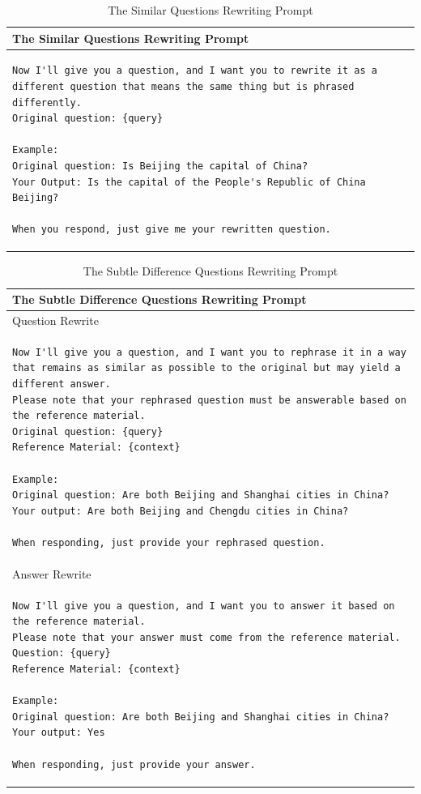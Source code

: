 \begin{table}[h]
\centering
\begin{tabular}{p{\textwidth}}
\toprule
\textbf{The Similar Questions Rewriting Prompt} \\ 
\midrule
\begin{lstlisting}[basicstyle=\ttfamily\small, frame=single, breaklines=true, breakindent=0pt]
Now I'll give you a question, and I want you to rewrite it as a different question that means the same thing but is phrased differently.
Original question: {query}

Example:
Original question: Is Beijing the capital of China?
Your Output: Is the capital of the People's Republic of China Beijing?

When you respond, just give me your rewritten question.
\end{lstlisting} \\
\bottomrule
\end{tabular}
\caption{The Similar Questions Rewriting Prompt}
\label{tab:similar-rewrite-prompt}
\end{table}

\begin{table}[h]
\centering
\begin{tabular}{p{\textwidth}}
\toprule
\textbf{The Subtle Difference Questions Rewriting Prompt} \\ 
\midrule
Question Rewrite \\
\hline
\begin{lstlisting}[basicstyle=\ttfamily\small, frame=single, breaklines=true, breakindent=0pt]
Now I'll give you a question, and I want you to rephrase it in a way that remains as similar as possible to the original but may yield a different answer.
Please note that your rephrased question must be answerable based on the reference material.
Original question: {query}
Reference Material: {context}

Example:
Original question: Are both Beijing and Shanghai cities in China?
Your output: Are both Beijing and Chengdu cities in China?

When responding, just provide your rephrased question.
\end{lstlisting} \\
\midrule
\hline
Answer Rewrite \\
\hline
\begin{lstlisting}[basicstyle=\ttfamily\small, frame=single, breaklines=true, breakindent=0pt]
Now I'll give you a question, and I want you to answer it based on the reference material.
Please note that your answer must come from the reference material.
Question: {query}
Reference Material: {context}

Example:
Original question: Are both Beijing and Shanghai cities in China?
Your output: Yes

When responding, just provide your answer.
\end{lstlisting} \\
\bottomrule
\end{tabular}
\caption{The Subtle Difference Questions Rewriting Prompt}
\label{tab:different-rewrite-prompt}
\end{table}



